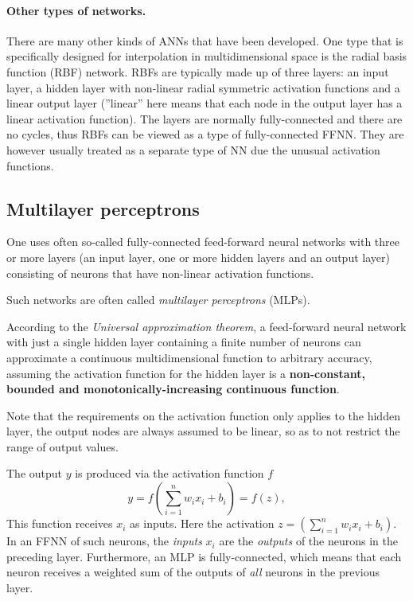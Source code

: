 \paragraph{Other types of networks.}
There are many other kinds of ANNs that have been developed. One type
that is specifically designed for interpolation in multidimensional
space is the radial basis function (RBF) network. RBFs are typically
made up of three layers: an input layer, a hidden layer with
non-linear radial symmetric activation functions and a linear output
layer (''linear'' here means that each node in the output layer has a
linear activation function). The layers are normally fully-connected
and there are no cycles, thus RBFs can be viewed as a type of
fully-connected FFNN. They are however usually treated as a separate
type of NN due the unusual activation functions.

\subsection*{Multilayer perceptrons}

One uses often so-called fully-connected feed-forward neural networks
with three or more layers (an input layer, one or more hidden layers
and an output layer) consisting of neurons that have non-linear
activation functions.

Such networks are often called \emph{multilayer perceptrons} (MLPs).

According to the \emph{Universal approximation theorem}, a feed-forward
neural network with just a single hidden layer containing a finite
number of neurons can approximate a continuous multidimensional
function to arbitrary accuracy, assuming the activation function for
the hidden layer is a \textbf{non-constant, bounded and
monotonically-increasing continuous function}.

Note that the requirements on the activation function only applies to
the hidden layer, the output nodes are always assumed to be linear, so
as to not restrict the range of output values.

The output $y$ is produced via the activation function $f$
\[
 y = f\left(\sum_{i=1}^n w_ix_i + b_i\right) = f(z),
\]
This function receives $x_i$ as inputs.
Here the activation $z=(\sum_{i=1}^n w_ix_i+b_i)$. 
In an FFNN of such neurons, the \emph{inputs} $x_i$ are the \emph{outputs} of
the neurons in the preceding layer. Furthermore, an MLP is
fully-connected, which means that each neuron receives a weighted sum
of the outputs of \emph{all} neurons in the previous layer.

